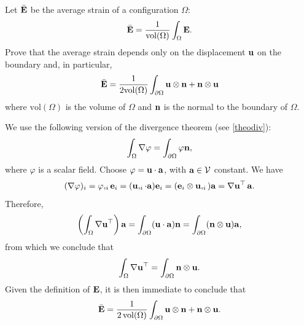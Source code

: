 \begin{exercise}\label{defmedia}
	Let $\bar{\mathbf{E}}$ be the average strain of a configuration ${\Omega}$:
	\begin{equation}
		\bar{\mathbf{E}} = \frac{1}{\textrm{vol}({\Omega})}\int_{\Omega}\mathbf{E}.
	\end{equation}
	Prove that the average strain depends only on the displacement $\mathbf{u}$ on the boundary and, in particular,
	\begin{equation}
		\bar{\mathbf{E}} = \frac{1}{2\textrm{vol}(\Omega)}\int_{\partial{\Omega}} \mathbf{u} \otimes \mathbf{n} + \mathbf{n} \otimes \mathbf{u}
	\end{equation}
	where $\textrm{vol}(\Omega)$ is the volume of $\Omega$ and $\mathbf{n}$ is the normal to the boundary of ${\Omega}$.
	
	\begin{svolgimento}
		We use the following version of the divergence theorem (see \eqref{theodiv}):
		\begin{equation}
			\int_{\Omega} \nabla \varphi = \int_{\partial\Omega} \varphi \mathbf{n},
		\end{equation}
		where $\varphi$ is a scalar field. Choose $\varphi = \mathbf{u} \cdot \mathbf{a}$, with $\mathbf{a} \in \mathcal{V}$ constant. We have
		\begin{equation}
			(\nabla \varphi)_i = \varphi,_i \mathbf{e}_i = (\mathbf{u},_{i}\cdot \mathbf{a}) \mathbf{e}_i = (\mathbf{e}_i \otimes \mathbf{u},_i) \mathbf{a} = \nabla \mathbf{u}^\top \, \mathbf{a}.
		\end{equation}
		Therefore,
		\begin{equation}
			\left( \int_{\Omega} \nabla \mathbf{u}^\top \right) \mathbf{a} = \int_{\partial{\Omega}} (\mathbf{u} \cdot \mathbf{a}) \mathbf{n} = \int_{\partial{\Omega}} (\mathbf{n} \otimes \mathbf{u}) \mathbf{a},
		\end{equation}
		from which we conclude that
		\begin{equation}
			\int_{\Omega} \nabla \mathbf{u}^\top = \int_{\partial{\Omega}} \mathbf{n} \otimes \mathbf{u}.
		\end{equation}
		Given the definition of $\mathbf{E}$, it is then immediate to conclude that
		\begin{equation}
			\bar{\mathbf{E}} = \frac{1}{2 \operatorname{vol}(\Omega)} \int_{\partial{\Omega}} \mathbf{u} \otimes \mathbf{n} + \mathbf{n} \otimes \mathbf{u}.
		\end{equation}
	\end{svolgimento}
\end{exercise}

